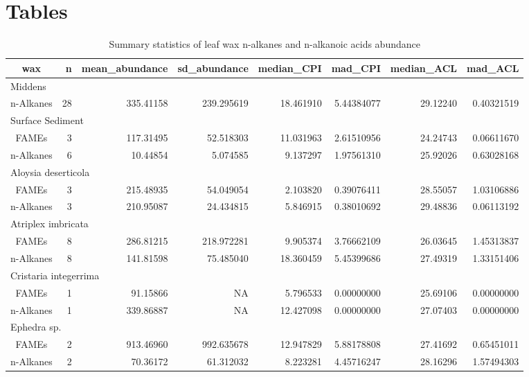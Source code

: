\documentclass[
  authoryear,
  preprint,
  3p]{elsarticle}
\begin{document}
\hypertarget{tables}{%
\section{Tables}\label{tables}}

\hypertarget{tbl-1}{}
\setlength{\LTpost}{0mm}
\begin{longtable}{crrrrrrr}
\caption{\label{tbl-1}Summary statistics of leaf wax n-alkanes and n-alkanoic acids abundance }\tabularnewline

\toprule
wax & n & mean\_abundance & sd\_abundance & median\_CPI & mad\_CPI & median\_ACL & mad\_ACL \\ 
\midrule
\multicolumn{8}{l}{Middens} \\ 
\midrule
n-Alkanes & 28 & 335.41158 & 239.295619 & 18.461910 & 5.44384077 & 29.12240 & 0.40321519 \\ 
\midrule
\multicolumn{8}{l}{Surface Sediment} \\ 
\midrule
FAMEs & 3 & 117.31495 & 52.518303 & 11.031963 & 2.61510956 & 24.24743 & 0.06611670 \\ 
n-Alkanes & 6 & 10.44854 & 5.074585 & 9.137297 & 1.97561310 & 25.92026 & 0.63028168 \\ 
\midrule
\multicolumn{8}{l}{Aloysia deserticola} \\ 
\midrule
FAMEs & 3 & 215.48935 & 54.049054 & 2.103820 & 0.39076411 & 28.55057 & 1.03106886 \\ 
n-Alkanes & 3 & 210.95087 & 24.434815 & 5.846915 & 0.38010692 & 29.48836 & 0.06113192 \\ 
\midrule
\multicolumn{8}{l}{Atriplex imbricata} \\ 
\midrule
FAMEs & 8 & 286.81215 & 218.972281 & 9.905374 & 3.76662109 & 26.03645 & 1.45313837 \\ 
n-Alkanes & 8 & 141.81598 & 75.485040 & 18.360459 & 5.45399686 & 27.49319 & 1.33151406 \\ 
\midrule
\multicolumn{8}{l}{Cristaria integerrima} \\ 
\midrule
FAMEs & 1 & 91.15866 & NA & 5.796533 & 0.00000000 & 25.69106 & 0.00000000 \\ 
n-Alkanes & 1 & 339.86887 & NA & 12.427098 & 0.00000000 & 27.07403 & 0.00000000 \\ 
\midrule
\multicolumn{8}{l}{Ephedra sp.} \\ 
\midrule
FAMEs & 2 & 913.46960 & 992.635678 & 12.947829 & 5.88178808 & 27.41692 & 0.65451011 \\ 
n-Alkanes & 2 & 70.36172 & 61.312032 & 8.223281 & 4.45716247 & 28.16296 & 1.57494303 \\ 

\end{longtable}
\end{document}
